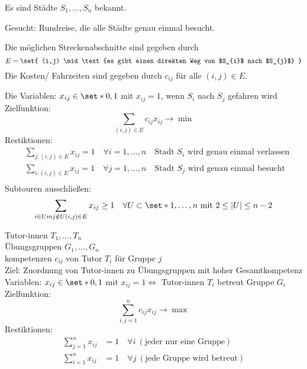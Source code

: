\begin{beispiel}\enter
	Es sind Städte $S_{1},\dots, S_{n}$ bekannt.

	Gesucht: Rundreise, die alle Städte genau einmal besucht.

  Die möglichen Streckenabschnitte sind gegeben durch
	\begin{equation*}
		E = \set{ (i,j) \mid \text{es gibt einen direkten Weg von $S_{i}$ nach $S_{j}$} }
	\end{equation*}
	Die Kosten/ Fahrzeiten sind gegeben durch $c_{ij}$ für alle $(i,j) \in E$.

	Die Variablen: $x_{ij} \in \set*{0,1}$ mit $x_{ij}=1$, wenn $S_{i}$ nach $S_j$ gefahren wird\\
	Zielfunktion:
	\begin{equation*}
		\sum_{(i,j)\in E}  c_{ij}x_{ij} \rightarrow \min
	\end{equation*}
	Restiktionen:
	\begin{align*}
		&\sum_{j:(i,j)\in E} x_{ij}=1 \quad \forall i = 1,\dots,n\quad \text{Stadt $S_{i}$ wird genau einmal verlassen}\\
		&\sum_{i:(i,j)\in E} x_{ij}=1 \quad \forall j = 1,\dots,n \quad\text{Stadt $S_{j}$ wird genau einmal besucht}\\
	\end{align*}
	Subtouren ausschließen:
	\begin{align*}
		\sum_{i\in Um j \not\in U (i,j) \in E} x_{ij} \geq 1 \quad \forall U \subset \set*{1,\dots,n} \text{ mit }2\leq |U|\leq n-2
	\end{align*}
\end{beispiel}

\begin{beispiel}\enter
	Tutor-innen $T_{1},\dots,T_{n}$ \\
	Übungsgruppen $G_{1},\dots, G_{n}$ \\
	kompetenzen $c_{ij}$ von Tutor $T_{i}$ für Gruppe $j$\\
	Ziel: Zuordnung von Tutor-innen zu Übungsgruppen mit hoher Gesamtkompetenz\\
	Variablen: $x_{ij}\in \set*{0,1}$ mit $x_{ij}=1 \iff$ Tutor-innen $T_{i}$ betreut Gruppe $G_{i}$ \\
	Zielfunktion:
	\begin{equation*}
		\sum_{i,j=1}^{n}  c_{ij}x_{ij} \rightarrow \max
	\end{equation*}
	Restiktionen:
	\begin{align*}
		\sum_{j=1}^{n} x_{ij} &= 1\quad \forall i\ (\text{jeder nur eine Gruppe})\\
		\sum_{i=1}^{n} x_{ij} &= 1\quad \forall j\ (\text{jede Gruppe wird betreut})
	\end{align*}
\end{beispiel}

